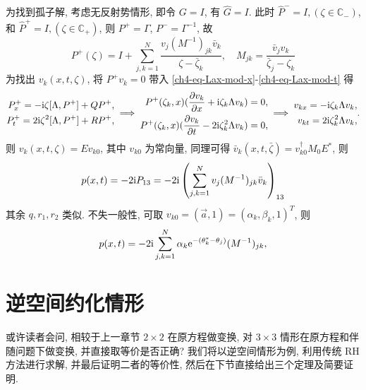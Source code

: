 为找到孤子解, 考虑无反射势情形, 即令 $G = I $, 有 $\hat{G} = I$. 此时 $\hat{P}^{-} = I, (\zeta \in \mathbb{C}_{-})$, 和 $\hat{P}^{+} = I, (\zeta \in \mathbb{C}_{+})$, 则 $P^{+} = \Gamma$, $P^{-} = \Gamma^{-1}$, 故
\begin{equation}
    P^{+}(\zeta) = I + \sum_{j,k=1}^{N} \frac{v_{j} \left(M^{-1}\right)_{jk} \bar{v}_{k}}{\zeta - \bar{\zeta}_{k}}, \quad M_{jk} = \frac{\bar{v}_{j} v_{k}}{\bar{\zeta}_{j} - \zeta_{k}}
    \label{ch4-eq-RHP-nonreflection}
\end{equation}
为找出 $ v_{k}(x,t, \zeta) $, 将 $ P^{+}v_{k} = 0 $ 带入 \eqref{ch4-eq-Lax-mod-x}-\eqref{ch4-eq-Lax-mod-t} 得
\begin{equation}
    \begin{aligned}
        P^{+}_{x} = - \mathrm{i} \zeta [\Lambda, P^{+}] + Q P^{+}, \\
        P^{+}_{t} = 2 \mathrm{i} \zeta^{2} [\Lambda, P^{+}] + R P^{+},
    \end{aligned}
    \implies
    \begin{aligned}
        P^{+}(\zeta_{k},x) (\frac{\partial v_{k}}{\partial x}+ \mathrm{i} \zeta_{k} \Lambda v_{k}) = 0, \\
        P^{+}(\zeta_{k},x) (\frac{\partial v_{k}}{\partial t} - 2 \mathrm{i} \zeta_{k}^{2} \Lambda v_{k}) = 0,
    \end{aligned}
    \implies
    \begin{aligned}
        v_{kx} = - \mathrm{i} \zeta_{k} \Lambda v_{k}, \\
        v_{kt} = 2 \mathrm{i} \zeta_{k}^{2} \Lambda v_{k},
    \end{aligned}.
\end{equation}
则 $ v_{k}(x,t, \zeta) = E v_{k0}$, 其中 $v_{k0}$ 为常向量, 同理可得 $ \bar{v}_{k}(x,t, \bar{\zeta}) = v_{k0}^{\dagger} M_{0} E^{*} $, 则
\begin{equation}
    p(x,t) = - 2 \mathrm{i} P_{13} = - 2 \mathrm{i} \left( \sum_{j,k=1}^{N} v_{j}(M^{-1})_{jk} \bar{v}_{k}\right)_{13} \label{ch4-eq-NLS-solution-q}
\end{equation}
其余 $ q, r_{1}, r_{2} $ 类似. 不失一般性, 可取 $ v_{k0} = (\vec{a}, 1) = (\alpha_{k}, \beta_{k}, 1)^{T} $, 则
\begin{equation}
    p(x,t) = - 2 \mathrm{i} \sum_{j,k=1}^{N} \alpha_{k} \mathrm{e}^{-(\theta_{k}^{*}-\theta_{j})}(M^{-1})_{jk},
\end{equation}

\section{逆空间约化情形}
或许读者会问, 相较于上一章节 $2 \times 2$ 在原方程做变换, 对 $3 \times 3$ 情形在原方程和伴随问题下做变换, 并直接取等价是否正确? 我们将以逆空间情形为例, 利用传统 RH 方法进行求解, 并最后证明二者的等价性, 然后在下节直接给出三个定理及简要证明.

